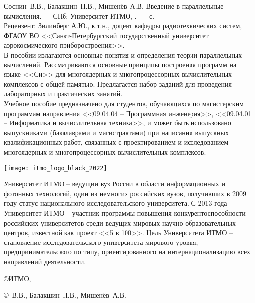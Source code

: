 \thispagestyle{empty}
 
Соснин~В.В., Балакшин~П.В., Мишенёв~А.В.
Введение в параллельные вычисления.
--- СПб: Университет ИТМО, \the\year.
--~\pageref{LastPage}~с. \\

Рецензент: Зилинберг А.Ю., к.т.н., доцент кафедры радиотехнических систем, ФГАОУ ВО <<Санкт-Петербургский государственный университет аэрокосмического приборостроения>>. \\

В пособии излагаются основные понятия и определения теории параллельных вычислений.
Рассматриваются основные принципы построения программ на языке <<Си>> для многоядерных и многопроцессорных вычислительных комплексов с общей памятью.
Предлагается набор заданий для проведения лабораторных и практических занятий. \\

Учебное пособие предназначено для студентов, обучающихся по магистерским программам направления <<09.04.04 -- Программная инженерия>>, <<09.04.01 -- Информатика и вычислительная техника>>, и может быть использовано выпускниками (бакалаврами и магистрантами) при написании выпускных квалификационных работ, связанных с проектированием и исследованием многоядерных и многопроцессорных вычислительных комплексов.

\vspace*{\fill}

\begin{flushright}
    \texttt{[image: itmo\_logo\_black\_2022]}
\end{flushright}

Университет ИТМО -- ведущий вуз России в области информационных и фотонных технологий, один из немногих российских вузов, получивших в 2009 году статус национального исследовательского университета.
С 2013 года Университет ИТМО -- участник программы повышения конкурентоспособности российских университетов среди ведущих мировых научно-образовательных центров, известной как проект <<5 в 100>>.
Цель Университета ИТМО -- становление исследовательского университета мирового уровня, предпринимательского по типу, ориентированного на интернационализацию всех направлений деятельности.

\begin{flushright}
    \copyright{} ИТМО, \the\year
    
    \copyright{}~В.В., Балакшин~П.В., Мишенёв~А.В., \the\year
\end{flushright}

